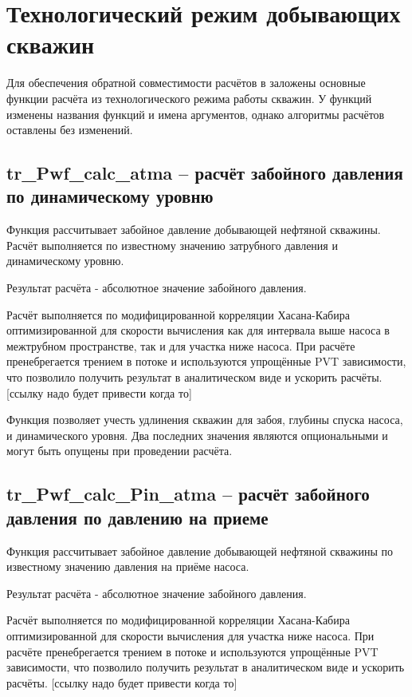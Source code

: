 \documentclass[]{scrreprt}
\begin{document}
\section{Технологический режим добывающих скважин}

 

Для обеспечения обратной совместимости расчётов в \unf заложены основные функции расчёта из технологического режима работы скважин. У функций изменены названия функций и имена аргументов, однако алгоритмы расчётов оставлены без изменений.

\newpage
\subsection{tr\_Pwf\_calc\_atma – расчёт забойного давления по динамическому уровню}

Функция рассчитывает забойное давление добывающей нефтяной скважины. Расчёт выполняется по известному значению затрубного давления и динамическому уровню. \cite{Khasanov_TR_2006}

Результат расчёта - абсолютное значение забойного давления. 

Расчёт выполняется по модифицированной корреляции Хасана-Кабира оптимизированной для скорости вычисления как для интервала выше насоса в межтрубном пространстве, так и для участка ниже насоса. При расчёте пренебрегается трением в потоке и используются упрощённые PVT зависимости, что позволило получить результат в аналитическом виде и ускорить расчёты. [ссылку надо будет привести когда то] 

Функция позволяет учесть удлинения скважин для забоя, глубины спуска насоса, и динамического уровня. Два последних значения являются опциональными и могут быть опущены при проведении расчёта. 




\subsection{tr\_Pwf\_calc\_Pin\_atma – расчёт забойного давления по давлению на приеме}
Функция рассчитывает забойное давление добывающей нефтяной скважины по известному значению давления на приёме насоса. 

Результат расчёта - абсолютное значение забойного давления. 

Расчёт выполняется по модифицированной корреляции Хасана-Кабира оптимизированной для скорости вычисления для участка ниже насоса. При расчёте пренебрегается трением в потоке и используются упрощённые PVT зависимости, что позволило получить результат в аналитическом виде и ускорить расчёты. [ссылку надо будет привести когда то] 
\end{document}
